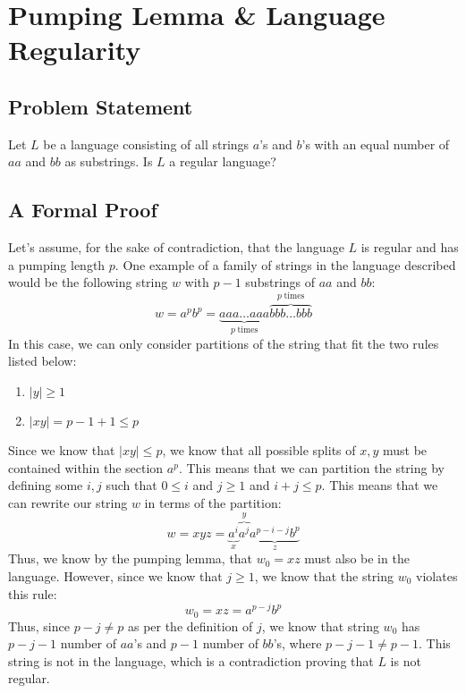 \section{Pumping Lemma & Language Regularity}
\subsection{Problem Statement}
Let $L$ be a language consisting of all strings $a$'s and $b$'s with an equal number of $aa$ and $bb$ as substrings. Is $L$ a regular language?
\subsection{A Formal Proof}

Let's assume, for the sake of contradiction, that the language $L$ is regular and has a pumping length $p$. One example of a family of strings in the language described would be the following string $w$ with $p-1$ substrings of $aa$ and $bb$:
$$
w = a^{p}b^{p} = \underbrace{aaa\dots aaa}_{p\;\text{times}}\overbrace{bbb\dots bbb}^{p\;\text{times}}
$$
In this case, we can only consider partitions of the string that fit the two rules listed below: 
\begin{enumerate}
    \item $|y| \geq 1$
    \item $|xy| = p - 1 + 1 \leq p$
\end{enumerate}
Since we know that $|xy| \leq p$, we know that all possible splits of $x,y$ must be contained within the section $a^p$. This means that we can partition the string by defining some $i,j$ such that $0 \leq i$ and $j \geq 1$  and $i + j \leq p$. This means that we can rewrite our string $w$ in terms of the partition:
$$
w = xyz = \underbrace{a^i}_{x}\overbrace{a^j}^y\underbrace{a^{p-i-j}b^p}_z
$$
Thus, we know by the pumping lemma, that $w_0 = xz$ must also be in the language. However, since we know that $j \geq 1$, we know that the string $w_0$ violates this rule:
$$
w_0 = xz = a^{p-j}b^p
$$
Thus, since $p-j \neq p$ as per the definition of $j$, we know that string $w_0$ has $p-j-1$ number of $aa$'s and $p-1$ number of $bb$'s, where $p-j-1 \neq p-1$. This string is not in the language, which is a contradiction proving that $L$ is not regular.